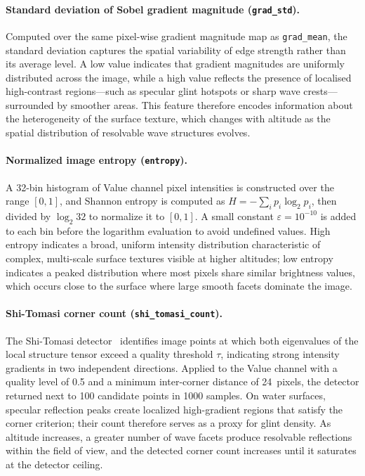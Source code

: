 \paragraph{Standard deviation of Sobel gradient magnitude (\texttt{grad\_std}).}
Computed over the same pixel-wise gradient magnitude map as \texttt{grad\_mean}, the standard deviation captures the spatial variability of edge strength rather than its average level. A low value indicates that gradient magnitudes are uniformly distributed across the image, while a high value reflects the presence of localised high-contrast regions---such as specular glint hotspots or sharp wave crests---surrounded by smoother areas. This feature therefore encodes information about the heterogeneity of the surface texture, which changes with altitude as the spatial distribution of resolvable wave structures evolves.

\paragraph{Normalized image entropy (\texttt{entropy}).} 
A 32-bin histogram of Value channel pixel intensities is constructed over the range $[0, 1]$, and Shannon entropy is computed as $H = -\sum_i p_i \log_2 p_i$, then divided by $\log_2 32$ to normalize it to $[0, 1]$. A small constant $\varepsilon = 10^{-10}$ is added to each bin before the logarithm evaluation to avoid undefined values. High entropy indicates a broad, uniform intensity distribution characteristic of complex, multi-scale surface textures visible at higher altitudes; low entropy indicates a peaked distribution where most pixels share similar brightness values, which occurs close to the surface where large smooth facets dominate the image.

\paragraph{Shi-Tomasi corner count (\texttt{shi\_tomasi\_count}).}
The Shi-Tomasi detector~\cite{ShiTomasi1994} identifies image points at which both eigenvalues of the local structure tensor exceed a quality threshold $\tau$, indicating strong intensity gradients in two independent directions. Applied to the Value channel with a quality level of 0.5 and a minimum inter-corner distance of 24~pixels, the detector returned next to 100 candidate points in 1000 samples. On water surfaces, specular reflection peaks create localized high-gradient regions that satisfy the corner criterion; their count therefore serves as a proxy for glint density. As altitude increases, a greater number of wave facets produce resolvable reflections within the field of view, and the detected corner count increases until it saturates at the detector ceiling.


